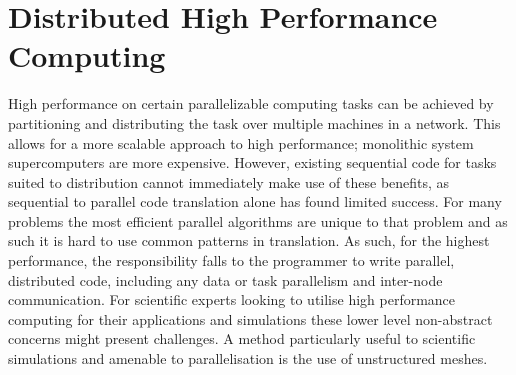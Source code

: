 \section{Distributed High Performance Computing}
High performance on certain parallelizable computing tasks can be achieved by partitioning and distributing the task over multiple machines in a network. This allows for a more scalable approach to high performance; monolithic system supercomputers are more expensive. However, existing sequential code for tasks suited to distribution cannot immediately make use of these benefits, as sequential to parallel code translation alone has found limited success. For many problems the most efficient parallel algorithms are unique to that problem and as such it is hard to use common patterns in translation. As such, for the highest performance, the responsibility falls to the programmer to write parallel, distributed code, including any data or task parallelism and inter-node communication. For scientific experts looking to utilise high performance computing for their applications and simulations these lower level non-abstract concerns  might present challenges. A method particularly useful to scientific simulations and amenable to parallelisation is the use of unstructured meshes.